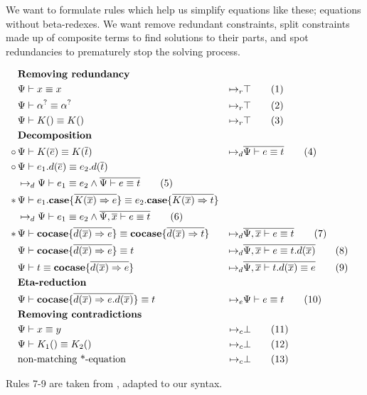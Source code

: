 \documentclass[twoside,12pt,a4paper]{article}
\begin{document}
We want to formulate rules which help us simplify equations like these; equations without beta-redexes.
We want remove redundant constraints, split constraints made up of composite terms to find solutions to their parts,
and spot redundancies to prematurely stop the solving process.
\begin{definition}
    \begin{align*}
    &\textbf{Removing redundancy}\\
    &\Psi \vdash x\equiv x&\mapsto_r&\top
    \tag{1}\\
    &\Psi \vdash \alpha^? \equiv \alpha^?&\mapsto_r& \top
    \tag{2}\\
    &\Psi \vdash K() \equiv K() &\mapsto_r& \top 
    \tag{3}\\
    &\textbf{Decomposition}\\
    \circ\,&\Psi\vdash K(\overline{e})\equiv K(\overline{t})&
    \mapsto_d&\overline{\Psi\vdash e\equiv t}
    \tag{4}\\
    \circ\,&\Psi \vdash e_1.d({\overline{e}})\equiv e_2.d({\overline{t}})
    \\ &\mapsto_d \Psi\vdash e_1 \equiv e_2 \wedge \overline{\Psi\vdash e\equiv t}
    \tag{5}\\
    *\,&\Psi \vdash e_1.\textbf{case}\{\overline{K(\overline{x})\Rightarrow e}\}\equiv e_2.\textbf{case}\{\overline{K(\overline{x})\Rightarrow t}\}
    \\ &\mapsto_d \Psi \vdash e_1 \equiv e_2\wedge \overline{\Psi, \overline{x}\vdash e\equiv t}
    \tag{6}\\
    *\, &\Psi\vdash \textbf{cocase}\{\overline{d(\overline{x})\Rightarrow e}\}\equiv 
    \textbf{cocase}\{\overline{d(\overline{x})\Rightarrow t}\}
    &\mapsto_d& \overline{\Psi, \overline{x}\vdash e \equiv t}
    \tag{7}\label{7}\\
    &\Psi\vdash \textbf{cocase}\{\overline{d(\overline{x})\Rightarrow e}\}\equiv t 
    &\mapsto_d& \overline{\Psi,\overline{x} \vdash e \equiv t.d(\overline{x})}
    \tag{8}\label{8}\\ 
    &\Psi\vdash t\equiv \textbf{cocase}\{\overline{d(\overline{x})\Rightarrow e}\} 
    &\mapsto_d& \overline{\Psi, \overline{x}\vdash t.d(\overline{x}) \equiv e}
    \tag{9}\label{9}\\
    &\textbf{Eta-reduction}\\
    & \Psi \vdash \textbf{cocase}\{\overline{d(\overline{x})\Rightarrow e.d(\overline{x})}\}\equiv t
    &\mapsto_e&\Psi\vdash e\equiv t
    \tag{10}\\
    &\textbf{Removing contradictions}\\ 
    &\Psi \vdash x\equiv y &\mapsto_c& \bot 
    \tag{11}\\   
    &\Psi \vdash K_1() \equiv K_2() &\mapsto_c& \bot 
    \tag{12}\\
    &\text{non-matching *-equation}&\mapsto_c&\bot
    \tag{13}\label{13}\\
    \end{align*}
\end{definition}
Rules 7-9 are taken from \cite{10.5555/2021953.2021960}, adapted to our syntax. 
\end{document}
